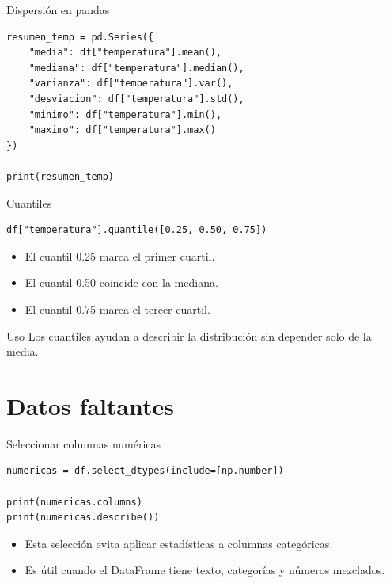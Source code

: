 \documentclass[10pt]{beamer}
\begin{document}
\begin{frame}[fragile]{Dispersión en pandas}
\begin{verbatim}
resumen_temp = pd.Series({
    "media": df["temperatura"].mean(),
    "mediana": df["temperatura"].median(),
    "varianza": df["temperatura"].var(),
    "desviacion": df["temperatura"].std(),
    "minimo": df["temperatura"].min(),
    "maximo": df["temperatura"].max()
})

print(resumen_temp)
\end{verbatim}
\end{frame}

\begin{frame}[fragile]{Cuantiles}
\begin{verbatim}
df["temperatura"].quantile([0.25, 0.50, 0.75])
\end{verbatim}

  \begin{itemize}
    \item El cuantil 0.25 marca el primer cuartil.
    \item El cuantil 0.50 coincide con la mediana.
    \item El cuantil 0.75 marca el tercer cuartil.
  \end{itemize}
  \begin{block}{Uso}
    Los cuantiles ayudan a describir la distribución sin depender solo de la media.
  \end{block}
\end{frame}

\section{Datos faltantes}

\begin{frame}[fragile]{Seleccionar columnas numéricas}
\begin{verbatim}
numericas = df.select_dtypes(include=[np.number])

print(numericas.columns)
print(numericas.describe())
\end{verbatim}

  \begin{itemize}
    \item Esta selección evita aplicar estadísticas a columnas categóricas.
    \item Es útil cuando el DataFrame tiene texto, categorías y números mezclados.
  \end{itemize}
\end{frame}
\end{document}
